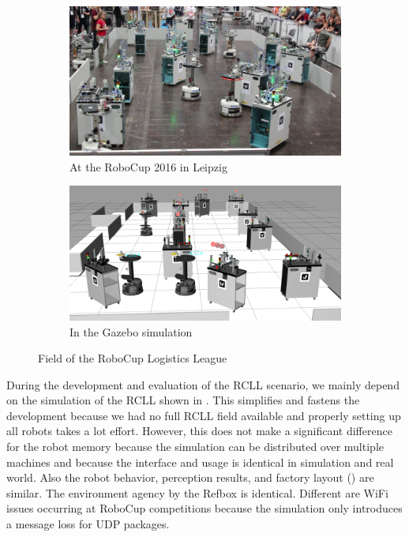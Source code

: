 \begin{figure}
  \centering
  \begin{subfigure}[b]{0.49\textwidth}
    \includegraphics[width=\textwidth]{img/rcll-field}
    \caption{At the RoboCup 2016 in Leipzig}
    \label{fig:rcll-real}
  \end{subfigure}
\hfill
  \begin{subfigure}[b]{0.49\textwidth}
    \includegraphics[width=\textwidth,height=0.55\textwidth]{img/rcll-sim}
    \caption{In the Gazebo simulation}
    \label{fig:rcll-sim}
  \end{subfigure}
  \caption[Field of the RoboCup Logistics League]{Field of the RoboCup Logistics League}
  \label{fig:rcll}
\end{figure}
During the development and evaluation of the RCLL scenario, we mainly
depend on the simulation of the RCLL shown in
. This simplifies and fastens the development
because we had no full RCLL field available and properly setting up
all robots takes a lot effort. However, this does not make a
significant difference for the robot memory because the simulation can
be distributed over multiple machines and because the interface and
usage is identical in simulation and real world. Also the robot
behavior, perception results, and factory layout ()
are similar. The environment agency by the Refbox is
identical. Different are WiFi issues occurring at RoboCup
competitions because the simulation only introduces a message loss for
UDP packages.

